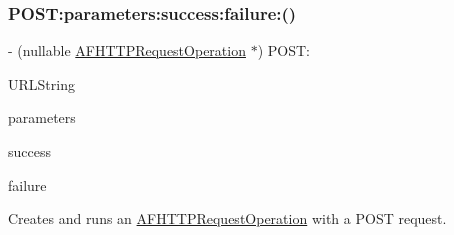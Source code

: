 \subsubsection{\texorpdfstring{P\+O\+S\+T\+:parameters\+:success\+:failure\+:()}{POST:parameters:success:failure:()}\hspace{0.1cm}{\footnotesize\ttfamily [3/3]}}
{\footnotesize\ttfamily -\/ (nullable \mbox{\hyperlink{interface_a_f_h_t_t_p_request_operation}{A\+F\+H\+T\+T\+P\+Request\+Operation}} $\ast$) P\+O\+S\+T\+: \begin{DoxyParamCaption}\item[{(N\+S\+String $\ast$)}]{U\+R\+L\+String }\item[{parameters:(nullable id)}]{parameters }\item[{success:(nullable void($^\wedge$)(\mbox{\hyperlink{interface_a_f_h_t_t_p_request_operation}{A\+F\+H\+T\+T\+P\+Request\+Operation}} $\ast$operation, id response\+Object))}]{success }\item[{failure:(nullable void($^\wedge$)(\mbox{\hyperlink{interface_a_f_h_t_t_p_request_operation}{A\+F\+H\+T\+T\+P\+Request\+Operation}} $\ast$\+\_\+\+\_\+nullable operation, N\+S\+Error $\ast$error))}]{failure }\end{DoxyParamCaption}}

Creates and runs an {\ttfamily \mbox{\hyperlink{interface_a_f_h_t_t_p_request_operation}{A\+F\+H\+T\+T\+P\+Request\+Operation}}} with a {\ttfamily P\+O\+ST} request.



